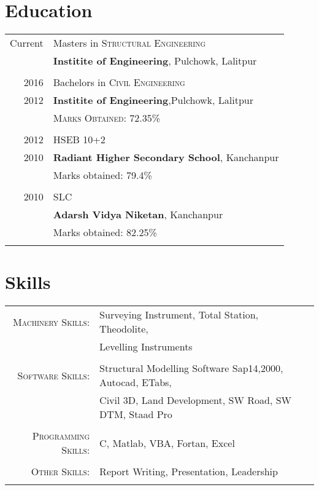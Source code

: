 \documentclass[a4paper,10pt]{article}
\begin{document}
\section{Education}
\begin{tabular}{rl}	
Current  & Masters in \textsc{Structural Engineering}\\
& \textbf{Institite of Engineering}, Pulchowk, Lalitpur\\
\\
2016  & Bachelors in \textsc{Civil Engineering}\\
2012 & \textbf{Institite of Engineering},Pulchowk, Lalitpur\\
& \normalsize \textsc{Marks Obtained}: 72.35\%\\\\
2012 & HSEB 10+2 \\ 
2010 &\normalsize\textbf{Radiant Higher Secondary School}, Kanchanpur\\
&Marks obtained: 79.4\%\\&\\
2010& SLC\\ & \textbf{Adarsh Vidya Niketan}, Kanchanpur\\
&Marks obtained: 82.25\%\\&\\
\end{tabular}



\section{Skills}
\begin{tabular}{rl}	
\textsc{Machinery Skills:} &Surveying Instrument, Total Station, Theodolite, \\& Levelling Instruments \\\\
\textsc{Software Skills:}  & Structural Modelling Software Sap14,2000, Autocad, ETabs, \\& Civil 3D, Land Development, SW Road, SW DTM, Staad Pro\\\\
\textsc{Programming Skills:} & C, Matlab, VBA, Fortan, Excel\\\\
\textsc{Other Skills:} & Report Writing, Presentation, Leadership\\\\
\end{tabular}
\end{document}
